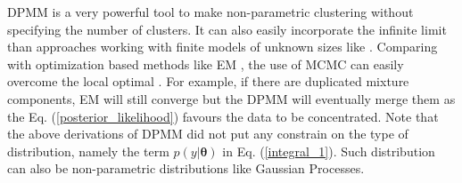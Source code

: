 DPMM is a very powerful tool to make non-parametric clustering without specifying the number of clusters. 
It can also easily incorporate the infinite limit than approaches working with finite models of unknown sizes like \cite{Bayesian_mixture}.
Comparing with optimization based methods like EM \cite{EM}, the use of MCMC can easily overcome the local optimal \cite{infinite_GMM}. 
For example, if there are duplicated mixture components, EM will still converge but the DPMM will eventually merge them as the Eq. (\ref{posterior_likelihood}) favours the data to be concentrated. 
Note that the above derivations of DPMM did not put any constrain on the type of distribution, namely the term $p(y|\bm{\theta})$ in Eq. (\ref{integral_1}). Such distribution can also be non-parametric distributions like Gaussian Processes. 
